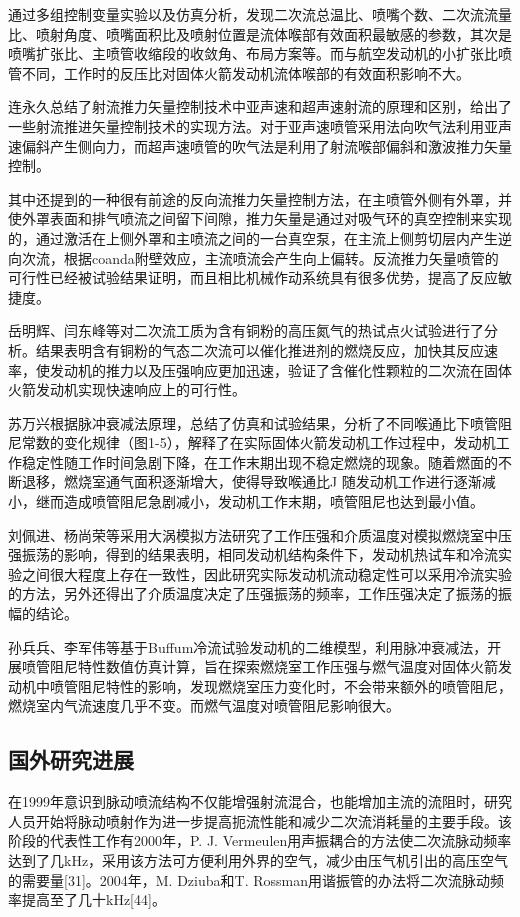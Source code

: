 通过多组控制变量实验以及仿真分析，发现二次流总温比、喷嘴个数、二次流流量比、喷射角度、喷嘴面积比及喷射位置是流体喉部有效面积最敏感的参数，其次是喷嘴扩张比、主喷管收缩段的收敛角、布局方案等。而与航空发动机的小扩张比喷管不同，工作时的反压比对固体火箭发动机流体喉部的有效面积影响不大。

连永久总结了射流推力矢量控制技术中亚声速和超声速射流的原理和区别，给出了一些射流推进矢量控制技术的实现方法。对于亚声速喷管采用法向吹气法利用亚声速偏斜产生侧向力，而超声速喷管的吹气法是利用了射流喉部偏斜和激波推力矢量控制。

其中还提到的一种很有前途的反向流推力矢量控制方法，在主喷管外侧有外罩，并使外罩表面和排气喷流之间留下间隙，推力矢量是通过对吸气环的真空控制来实现的，通过激活在上侧外罩和主喷流之间的一台真空泵，在主流上侧剪切层内产生逆向次流，根据coanda附壁效应，主流喷流会产生向上偏转。反流推力矢量喷管的可行性已经被试验结果证明，而且相比机械作动系统具有很多优势，提高了反应敏捷度。

岳明辉、闫东峰等对二次流工质为含有铜粉的高压氮气的热试点火试验进行了分析。结果表明含有铜粉的气态二次流可以催化推进剂的燃烧反应，加快其反应速率，使发动机的推力以及压强响应更加迅速，验证了含催化性颗粒的二次流在固体火箭发动机实现快速响应上的可行性。

苏万兴根据脉冲衰减法原理，总结了仿真和试验结果，分析了不同喉通比下喷管阻尼常数的变化规律（图1-5），解释了在实际固体火箭发动机工作过程中，发动机工作稳定性随工作时间急剧下降，在工作末期出现不稳定燃烧的现象。随着燃面的不断退移，燃烧室通气面积逐渐增大，使得导致喉通比J 随发动机工作进行逐渐减小，继而造成喷管阻尼急剧减小，发动机工作末期，喷管阻尼也达到最小值。


刘佩进、杨尚荣等采用大涡模拟方法研究了工作压强和介质温度对模拟燃烧室中压强振荡的影响，得到的结果表明，相同发动机结构条件下，发动机热试车和冷流实验之间很大程度上存在一致性，因此研究实际发动机流动稳定性可以采用冷流实验的方法，另外还得出了介质温度决定了压强振荡的频率，工作压强决定了振荡的振幅的结论。

孙兵兵、李军伟等基于Buffum冷流试验发动机的二维模型，利用脉冲衰减法，开展喷管阻尼特性数值仿真计算，旨在探索燃烧室工作压强与燃气温度对固体火箭发动机中喷管阻尼特性的影响，发现燃烧室压力变化时，不会带来额外的喷管阻尼，燃烧室内气流速度几乎不变。而燃气温度对喷管阻尼影响很大。

\subsection{国外研究进展}
在1999年意识到脉动喷流结构不仅能增强射流混合，也能增加主流的流阻时，研究人员开始将脉动喷射作为进一步提高扼流性能和减少二次流消耗量的主要手段。该阶段的代表性工作有2000年，P. J. Vermeulen用声振耦合的方法使二次流脉动频率达到了几kHz，采用该方法可方便利用外界的空气，减少由压气机引出的高压空气的需要量[31]。2004年，M. Dziuba和T. Rossman用谐振管的办法将二次流脉动频率提高至了几十kHz[44]。

